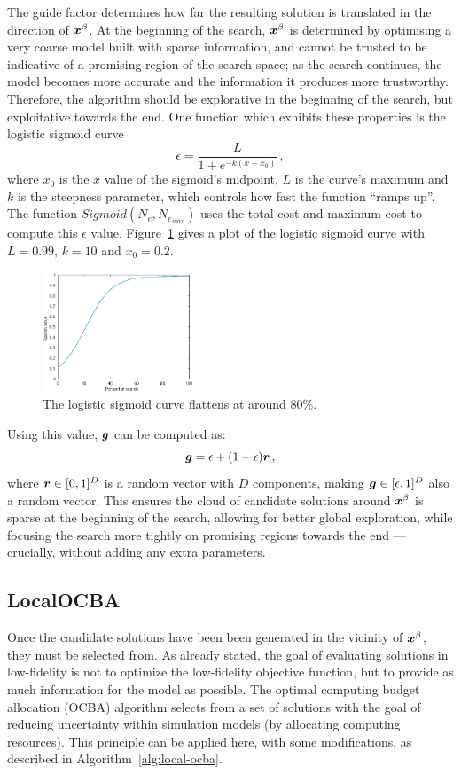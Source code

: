 The guide factor determines how far the resulting solution is translated in the direction of $\boldsymbol{x}^\beta$. At the beginning of the search, $\boldsymbol{x}^\beta$ is determined by optimising a very coarse model built with sparse information, and cannot be trusted to be indicative of a promising region of the search space; as the search continues, the model becomes more accurate and the information it produces more trustworthy. Therefore, the algorithm should be explorative in the beginning of the search, but exploitative towards the end. One function which exhibits these properties is the logistic sigmoid curve
\begin{equation}
\epsilon = \dfrac{L}{1+e^{-k(x-x_0)}}\,,
\end{equation}
where $x_0$ is the $x$ value of the sigmoid's midpoint, $L$ is the curve's maximum and $k$ is the steepness parameter, which controls how fast the function ``ramps up''. The function $Sigmoid(N_e,N_{e_{max}})$ uses the total cost and maximum cost to compute this $\epsilon$ value. Figure~\ref{fig:logistic} gives a plot of the logistic sigmoid curve with $L=0.99$, $k=10$ and $x_0 = 0.2$. 
\begin{figure}[h!]
  \centering
  \includegraphics[width = 0.40\textwidth]{img/logistic.eps} 
  \caption{The logistic sigmoid curve flattens at around 80\%.} 
    \label{fig:logistic}
\end{figure}
Using this value, $\boldsymbol{g}$ can be computed as:
\begin{equation}
\boldsymbol{g} = \epsilon + (1-\epsilon)\boldsymbol{r}\,,
\end{equation}
where $\boldsymbol{r} \in [0,1]^D$ is a random vector with $D$ components, making $\boldsymbol{g} \in [\epsilon,1]^D$ also a random vector. This ensures the cloud of candidate solutions around $\boldsymbol{x}^\beta$ is sparse at the beginning of the search, allowing for better global exploration, while focusing the search more tightly on promising regions towards the end --- crucially, without adding any extra parameters. 

\subsection{LocalOCBA}\label{subsec:local}
Once the candidate solutions have been been generated in the vicinity of $\boldsymbol{x}^\beta$, they must be selected from. As already stated, the goal of evaluating solutions in low-fidelity is not to optimize the low-fidelity objective function, but to provide as much information for the model as possible. The optimal computing budget allocation (OCBA) algorithm selects from a set of solutions with the goal of reducing uncertainty within simulation models (by allocating computing resources). This principle can be applied here, with some modifications, as described in Algorithm~\ref{alg:local-ocba}.

